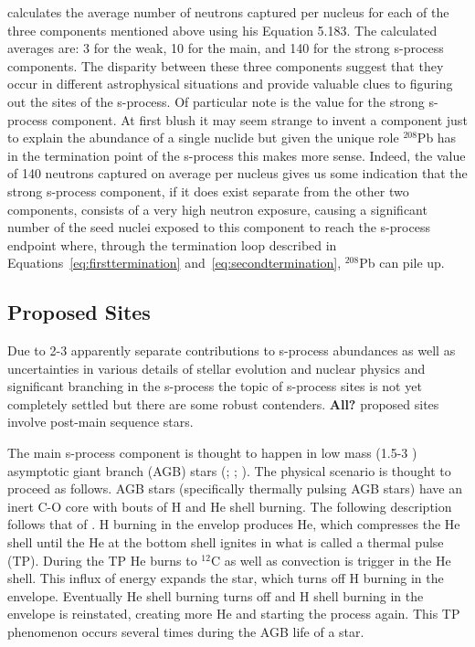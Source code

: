 \cite{iliadis2008} calculates the average number of neutrons captured
per nucleus for each of the three components mentioned above using his
Equation 5.183.  The calculated averages are: 3 for the weak, 10 for
the main, and 140 for the strong s-process components.  The disparity
between these three components suggest that they occur in different
astrophysical situations and provide valuable clues to figuring out
the sites of the s-process.  Of particular note is the value for the
strong s-process component.  At first blush it may seem strange to
invent a component just to explain the abundance of a single nuclide
but given the unique role $^{208}$Pb has in the termination point of
the s-process this makes more sense.  Indeed, the value of 140
neutrons captured on average per nucleus gives us some indication that
the strong s-process component, if it does exist separate from the
other two components, consists of a very high neutron exposure,
causing a significant number of the seed nuclei exposed to this
component to reach the s-process endpoint where, through the
termination loop described in Equations~\ref{eq:firsttermination}
and~\ref{eq:secondtermination}, $^{208}$Pb can pile up.

\subsection{Proposed Sites}

Due to 2-3 apparently separate contributions to s-process abundances
as well as uncertainties in various details of stellar evolution and
nuclear physics and significant branching in the s-process 
the topic of s-process sites is not yet completely
settled but there are some robust contenders.  {\bf All?} proposed
sites involve post-main sequence stars.  

The main s-process component is thought to happen in low mass
(1.5-3 \Msol) asymptotic giant branch (AGB) stars
(\citealt{schwarzschild1967}; \citealt{bussoetal1999}; 
\citealt{arlandinietal1999}).
The physical scenario is thought to proceed as follows.  AGB stars
(specifically thermally pulsing AGB stars)
have an inert C-O core with bouts of H and He shell burning.  The
following description follows that of \cite{kappeleretal2011}.  H
burning in the envelop produces He, which compresses the He shell
until the He at the bottom shell ignites in what is called a thermal
pulse (TP).  During the TP He burns to $^{12}$C as well as convection
is trigger in the He shell.  This influx of energy expands the star,
which turns off H burning in the envelope.  Eventually He shell
burning turns off and H shell burning in the envelope is reinstated,
creating more He and starting the process again.  This TP phenomenon 
occurs several times during the AGB life of a star.

